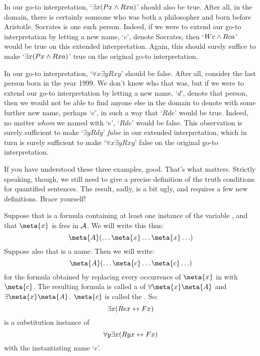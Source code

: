 In our go-to interpretation, `$\exists x (Px \wedge Rxa)$' should also be true. After all, in the domain, there is certainly someone who was both a philosopher and born before Aristotle. Socrates is one such person. Indeed, if we were to extend our go-to interpretation by letting a new name, `$c$', denote Socrates, then `$Wc \wedge Rca$' would be true on this extended interpretation. Again, this should surely suffice to make `$\exists x (Px \wedge Rxa)$' true on the original go-to interpretation. 

In our go-to interpretation, `$\forall x \exists y Rxy$' should be false. After all, consider the last person born in the year 1999. We don't know who that was, but if we were to extend our go-to interpretation by letting a new name, `$d$', denote that person, then we would not be able to find anyone else in the domain to denote with some further new name, perhaps `$e$', in such a way that `$Rde$' would be true. Indeed, no matter \emph{whom} we named with `$e$', `$Rde$' would be false. This observation is surely sufficient to make `$\exists y Rdy$' \emph{false} in our extended interpretation, which in turn is surely sufficient to make `$\forall x \exists y Rxy$' false on the original go-to interpretation.

If you have understood these three examples, good. That's what matters. Strictly speaking, though, we still need to give a precise definition of the truth conditions for quantified sentences. The result, sadly, is a bit ugly, and requires a few new definitions. Brace yourself!

Suppose that  is a formula containing at least one instance of the variable , and that $\meta{x}$ is free in $\mathcal{A}$. We will write this thus:
$$\meta{A}(\ldots \meta{x} \ldots \meta{x} \ldots)$$
Suppose also that  is a name. Then we will write:
$$\meta{A}(\ldots \meta{c} \ldots \meta{c} \ldots)$$
for the formula obtained by replacing every occurrence of $\meta{x}$ in  with $\meta{c}$. The resulting formula is called a  of $\forall \meta{x}\meta{A}$ and $\exists\meta{x}\meta{A}$.  $\meta{c}$ is called the . So:
	$$\exists x (Rex \leftrightarrow Fx)$$
is a substitution instance of 
	$$\forall y \exists x (Ryx \leftrightarrow Fx)$$
with the instantiating name `$e$'.


